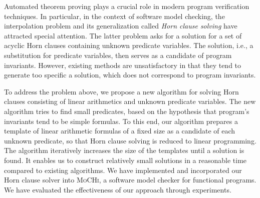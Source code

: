 \begin{eabstract}
Automated theorem proving plays a crucial role in modern program
verification techniques.  In particular, in the context of software
model checking, the interpolation problem and its generalization
called \emph{Horn clause solving} have attracted special attention.
The latter problem asks for a solution for a set of acyclic Horn
clauses containing unknown predicate variables.  The solution, i.e., a
substitution for predicate variables, then serves as a candidate of
program invariants.  However, existing methods are unsatisfactory in
that they tend to generate too specific a solution, which does not
correspond to program invariants.

To address the problem above, we propose a new algorithm for solving
Horn clauses consisting of linear arithmetics and unknown predicate
variables.  The new algorithm tries to find small predicates, based on
the hypothesis that program's invariants tend to be simple formulas.
To this end, our algorithm prepares a template of linear arithmetic
formulas of a fixed size as a candidate of each unknown predicate, so
that Horn clause solving is reduced to linear programming.  The
algorithm iteratively increases the size of the templates until a
solution is found.  It enables us to construct relatively small
solutions in a reasonable time compared to existing algorithms.  We
have implemented and incorporated our Horn clause solver into
\textsc{MoCHi}, a software model checker for functional programs.  We
have evaluated the effectiveness of our approach through experiments.
\end{eabstract}
